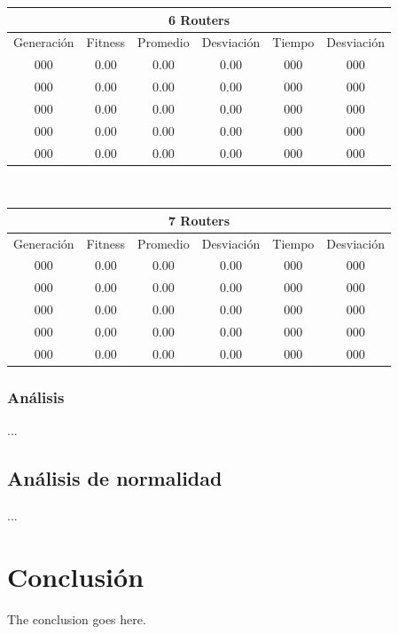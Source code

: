 \documentclass[journal]{IEEEtran}
\begin{document}
\begin{table}[h]
\begin{tabular}{|c||c|c|c||c|c|}
\hline
\multicolumn{6}{|c|}{6 Routers}\\
\hline
Generación & Fitness & Promedio & Desviación & Tiempo & Desviación \\
\hline
000 & 0.00 & 0.00 & 0.00 & 000 & 000 \\
000 & 0.00 & 0.00 & 0.00 & 000 & 000 \\
000 & 0.00 & 0.00 & 0.00 & 000 & 000 \\
000 & 0.00 & 0.00 & 0.00 & 000 & 000 \\
000 & 0.00 & 0.00 & 0.00 & 000 & 000 \\
\hline
\end{tabular}
\\[2ex]

\begin{tabular}{|c||c|c|c||c|c|}
\hline
\multicolumn{6}{|c|}{7 Routers}\\
\hline
Generación & Fitness & Promedio & Desviación & Tiempo & Desviación \\
\hline
000 & 0.00 & 0.00 & 0.00 & 000 & 000 \\
000 & 0.00 & 0.00 & 0.00 & 000 & 000 \\
000 & 0.00 & 0.00 & 0.00 & 000 & 000 \\
000 & 0.00 & 0.00 & 0.00 & 000 & 000 \\
000 & 0.00 & 0.00 & 0.00 & 000 & 000 \\
\hline
\end{tabular}

\label{tab:evaluation}
\end{table}

\subsubsection*{Análisis}

...

\subsection{Análisis de normalidad}

...

\section{Conclusión}

The conclusion goes here.

\appendices
\end{document}
